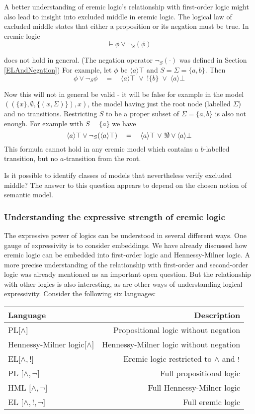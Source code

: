 A better understanding of eremic logic's relationship with first-order
logic might also lead to insight into excluded middle in eremic logic.
The logical law of excluded middle states that either a proposition or
its negation must be true. In eremic logic
\[
\models \phi \lor \neg_S(\phi)
\]

\NI does not hold in general. (The negation operator $\neg_{S}(\cdot)$
was defined in Section \ref{ELAndNegation}) For example, let $\phi$ be
$\langle a \rangle \top$ and $S = \Sigma = \{a, b\}$.  Then
\[
   \phi \lor \neg_{S} \phi 
       \quad=\quad 
   \langle a \rangle \top \; \lor \; ! \{b\} \; \lor \; \langle a \rangle \bot
\]

\NI Now this will not in general be valid - it will be false for
example in the model $((\{x\}, \emptyset, \{(x, \Sigma)\}), x)$, the
model having just the root node (labelled $\Sigma$) and no transitions.
Restricting $S$ to be a proper subset of $\Sigma = \{a, b\}$ is also not
enough. For example with $S = \{a\}$ we have
\[
   \langle a \rangle \top \lor \neg_{S}(\langle a \rangle \top)
      \quad=\quad
   \langle a \rangle \top\ \lor\ !\emptyset \lor \langle a \rangle \bot
\]
This formula cannot hold in any eremic model which contains a
$b$-labelled transition, but no $a$-transition from the root.

Is it possible to identify classes of models that nevertheless verify
excluded middle? The answer to this question appears to depend 
on the chosen notion of semantic model.

\subsubsection{Understanding the expressive strength of eremic logic}

The expressive power of logics can be understood in several different
ways. One gauge of expressivity is to consider embeddings.  We have
already discussed how eremic logic can be embedded into first-order
logic and Hennessy-Milner logic.  A more precise understanding of the
relationship with first-order and second-order logic was already
mentioned as an important open question. But the relationship with
other logics is also interesting, as are other ways of understanding
logical expressivity.  Consider the following six languages:



\begin{center}
\begin{tabular}{ l | r }
Language & Description \\
\hline
PL[$\land$] & Propositional logic without negation \\
Hennessy-Milner logic[$\land$] & Hennessy-Milner logic without negation \\
EL[$\land, !$] & Eremic logic restricted to $\land$ and $!$ \\
PL [$\land, \neg$] & Full propositional logic \\
HML [$\land, \neg$] & Full Hennessy-Milner logic \\
EL [$\land, !, \neg$] & Full eremic logic \\
\end{tabular}
\end{center}


